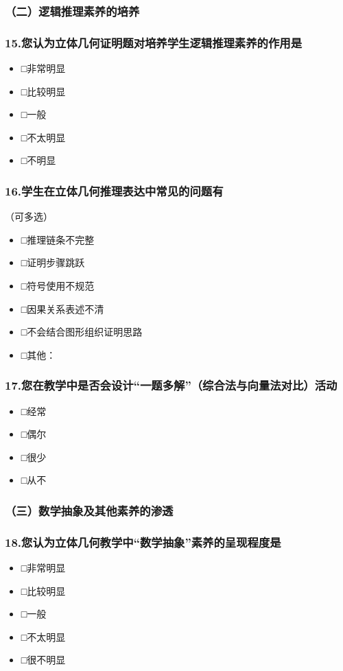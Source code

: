 \documentclass[UTF8,a4paper,12pt,twoside]{ctexart}
\begin{document}
\subsubsection*{（二）逻辑推理素养的培养}

\subsubsection*{15.您认为立体几何证明题对培养学生逻辑推理素养的作用是}
\begin{itemize}
\item □非常明显
\item □比较明显
\item □一般
\item □不太明显
\item □不明显
\end{itemize}

\subsubsection*{16.学生在立体几何推理表达中常见的问题有}
（可多选）
\begin{itemize}
\item □推理链条不完整
\item □证明步骤跳跃
\item □符号使用不规范
\item □因果关系表述不清
\item □不会结合图形组织证明思路
\item □其他：\underline{\hspace{2cm}}
\end{itemize}

\subsubsection*{17.您在教学中是否会设计“一题多解”（综合法与向量法对比）活动}
\begin{itemize}
\item □经常
\item □偶尔
\item □很少
\item □从不
\end{itemize}

\subsubsection*{（三）数学抽象及其他素养的渗透}

\subsubsection*{18.您认为立体几何教学中“数学抽象”素养的呈现程度是}
\begin{itemize}
\item □非常明显
\item □比较明显
\item □一般
\item □不太明显
\item □很不明显
\end{itemize}
\end{document}
